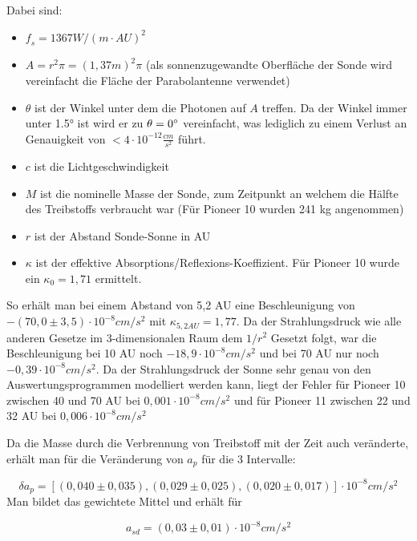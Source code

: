 Dabei sind:
\begin{itemize}
\item $\mathit{f_s}=1367W/(\mathit{m\cdot AU})^2$
\item $A=r^2\pi =(1,37m)^2\pi $ (als sonnenzugewandte Oberfl\"ache der Sonde wird vereinfacht
die Fl\"ache der Parabolantenne verwendet)
\item $\theta $ ist der Winkel unter dem die Photonen auf $A$ treffen. Da der Winkel immer unter 1.5° ist wird er zu $\theta = 0\degree$ vereinfacht, was lediglich zu einem Verlust an Genauigkeit von $< 4 \cdot 10^{-12} \frac{cm}{s^2}$\cite{Markwardt2002} führt.
\item $c$ ist die Lichtgeschwindigkeit
\item $M$ ist die nominelle Masse der Sonde, zum Zeitpunkt an welchem die H\"alfte des
Treibstoffs verbraucht war (F\"ur Pioneer 10 wurden 241 kg angenommen)
\item $r$ ist der Abstand Sonde-Sonne in AU
\item $\kappa $ ist der effektive Absorptions/Reflexions-Koeffizient. F\"ur
Pioneer 10 wurde ein $\kappa_0=1,71 $ ermittelt\cite{Anderson2002}.
\end{itemize}

\bigskip

So erh\"alt man bei einem Abstand von 5,2 AU eine Beschleunigung von
$-(70,0\pm 3,5)\cdot 10^{-8}\mathit{cm}/s^{2}$ mit $\kappa_{5,2 AU}=1,77$.
Da der Strahlungsdruck wie alle anderen
Gesetze im 3-dimensionalen Raum dem $1/r^{2}$ Gesetzt folgt, war die
Beschleunigung bei 10 AU noch $-18,9\cdot 10^{-8}\mathit{cm}/s^{2}$
und bei 70 AU nur noch $-0,39\cdot 10^{-8}\mathit{cm}/s^{2}$. Da der
Strahlungsdruck der Sonne sehr genau von den Auswertungsprogrammen
modelliert werden kann, liegt der Fehler f\"ur Pioneer 10 zwischen 40
und 70 AU bei $0,001\cdot 10^{-8}\mathit{cm}/s^{2}$ und f\"ur Pioneer
11 zwischen 22 und 32 AU bei $0,006\cdot 10^{-8}\mathit{cm}/s^{2}$

Da die Masse durch die Verbrennung von Treibstoff mit der Zeit auch
ver\"anderte, erh\"alt man f\"ur die Ver\"anderung von $a_{p}$ f\"ur
die 3 Intervalle\cite{Anderson2002}:

\begin{equation}
\mathit{\delta a}_{p}=[(0,040\pm 0,035),(0,029\pm 0,025),(0,020\pm
0,017)]\cdot 10^{-8}\mathit{cm}/s^{2}
\end{equation}
Man bildet das gewichtete Mittel und erh\"alt f\"ur

\begin{equation}
a_{\mathit{sd}}=(0,03\pm 0,01)\cdot 10^{-8}\mathit{cm}/s^{2}
\end{equation}

